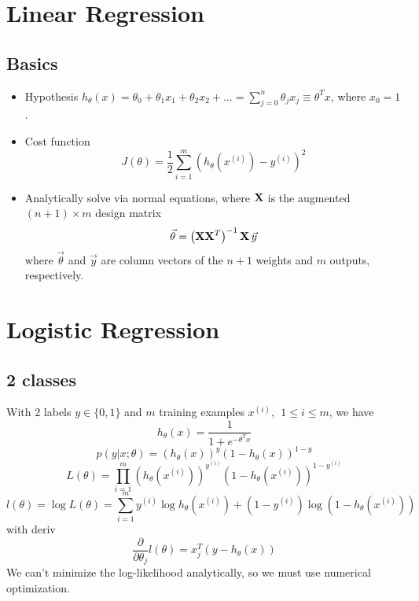 \documentclass[11pt]{article}
\begin{document}
\newpage
\section{Linear Regression}
\label{sec:linreg}
\subsection{Basics}
\begin{itemize}
  \item Hypothesis
  $h_\theta(x) = \theta_0 + \theta_1 x_1 + \theta_2 x_2 + \dots = \sum_{j=0}^{n}
  \theta_j x_j \equiv \theta^T x$, where $x_0 = 1$.
  \item Cost function
  \begin{equation}
    J(\theta) = \frac{1}{2} \sum_{i=1}^m \left(h_\theta(x^{(i)}) - y^{(i)}\right)^2
  \end{equation}
  \item Analytically solve via normal equations, where $\mathbf{X}$ is the augmented
  $(n+1) \times m$ design matrix
  \begin{equation}
    \vec{\theta} = \left(\mathbf{X} \mathbf{X}^T\right)^{-1} \mathbf{X}\, \vec{y}
  \end{equation}
  where $\vec{\theta}$ and $\vec{y}$ are column vectors of the $n+1$ weights and $m$
  outputs, respectively.
\end{itemize}



\section{Logistic Regression}
\label{sec:logreg}
\subsection{2 classes}
With 2 labels $y \in \{0,1\}$ and $m$ training examples
$x^{(i)},\ \ 1 \leq i \leq m$, we have
\begin{equation}
  h_\theta (x) = \frac{1}{1 + e^{-\theta^T x}}
\end{equation}
\begin{equation}
  p(y|x;\theta) = (h_\theta (x))^y (1 - h_\theta (x))^{1-y}
\end{equation}
\begin{equation}
  L(\theta) = \prod_{i=1}^m (h_\theta (x^{(i)}))^{y^{(i)}} (1 - h_\theta
  (x^{(i)}))^{1-y^{(i)}} 
\end{equation}
\begin{equation}
  l(\theta) = \log L(\theta) = \sum_{i=1}^m y^{(i)} \log h_\theta (x^{(i)}) + (1 -
  y^{(i)}) \log(1 - h_\theta  (x^{(i)}))
\end{equation}
with deriv
\begin{equation}
  \frac{\partial}{\partial \theta_j} l(\theta) = x_j^T (y - h_\theta (x))
\end{equation}
We can't minimize the log-likelihood analytically, so we must use numerical
optimization.
\end{document}
